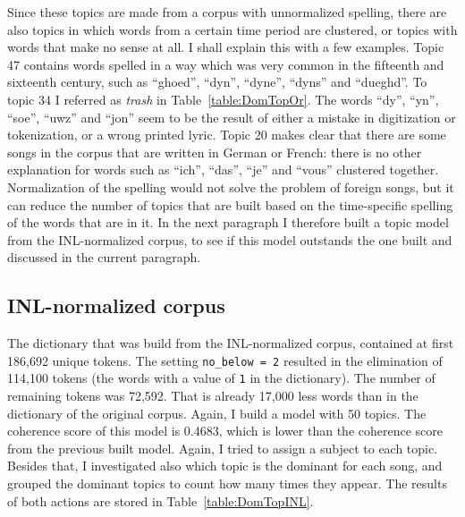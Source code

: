 Since these topics are made from a corpus with unnormalized spelling, there are also topics in which words from a certain time period are clustered, or topics with words that make no sense at all. I shall explain this with a few examples. Topic 47 contains words spelled in a way which was very common in the fifteenth and sixteenth century, such as \enquote{ghoed}, \enquote{dyn}, \enquote{dyne}, \enquote{dyns} and \enquote{dueghd}. To topic 34 I referred as \textit{trash} in Table~\ref{table:DomTopOr}. The words \enquote{dy}, \enquote{yn}, \enquote{soe}, \enquote{uwz} and \enquote{jon} seem to be the result of either a mistake in digitization or tokenization, or a wrong printed lyric. Topic 20 makes clear that there are some songs in the corpus that are written in German or French: there is no other explanation for words such as \enquote{ich}, \enquote{das}, \enquote{je} and \enquote{vous} clustered together. Normalization of the spelling would not solve the problem of foreign songs, but it can reduce the number of topics that are built based on the time-specific spelling of the words that are in it. In the next paragraph I therefore built a topic model from the INL-normalized corpus, to see if this model outstands the one built and discussed in the current paragraph.

\subsection{INL-normalized corpus}
The dictionary that was build from the INL-normalized corpus, contained at first 186,692 unique tokens. The setting \texttt{no\_below = 2} resulted in the elimination of 114,100 tokens (the words with a value of \texttt{1} in the dictionary). The number of remaining tokens was 72,592. That is already 17,000 less words than in the dictionary of the original corpus. Again, I build a model with 50 topics. The coherence score of this model is 0.4683, which is lower than the coherence score from the previous built model. Again, I tried to assign a subject to each topic. Besides that, I investigated also which topic is the dominant for each song, and grouped the dominant topics to count how many times they appear. The results of both actions are stored in Table~\ref{table:DomTopINL}.

